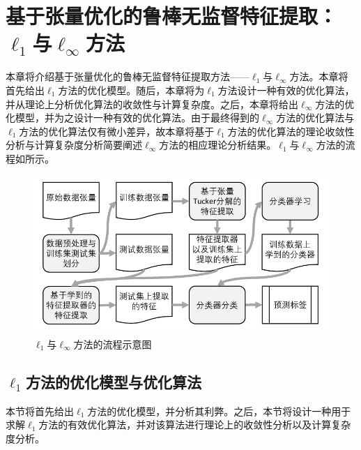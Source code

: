 \chapter[基于张量优化的鲁棒无监督特征提取：$\ell_{1}$与$\ell_{\infty}$方法]{基于张量优化的鲁棒无监督特征提取：\\$\ell_{1}$与$\ell_{\infty}$方法}\label{chap:linf}

本章将介绍基于张量优化的鲁棒无监督特征提取方法——$\ell_{1}$与$\ell_{\infty}$方法。本章将首先给出$\ell_{1}$方法的优化模型。随后，本章将为$\ell_{1}$方法设计一种有效的优化算法，并从理论上分析优化算法的收敛性与计算复杂度。之后，本章将给出$\ell_{\infty}$方法的优化模型，并为之设计一种有效的优化算法。由于最终得到的$\ell_{\infty}$方法的优化算法与$\ell_{1}$方法的优化算法仅有微小差异，故本章将基于$\ell_{1}$方法的优化算法的理论收敛性分析与计算复杂度分析简要阐述$\ell_{\infty}$方法的相应理论分析结果。$\ell_{1}$与$\ell_{\infty}$方法的流程如所示。

\begin{figure}[!ht]
	\centering
    \includegraphics[width=.8\linewidth]{figures/pipeline-ufe.pdf}
	\caption{$\ell_{1}$与$\ell_{\infty}$方法的流程示意图}
	\label{fig:l1linf-routine}
\end{figure}

\section{$\ell_{1}$方法的优化模型与优化算法}
本节将首先给出$\ell_{1}$方法的优化模型，并分析其利弊。之后，本节将设计一种用于求解$\ell_{1}$方法的有效优化算法，并对该算法进行理论上的收敛性分析以及计算复杂度分析。
